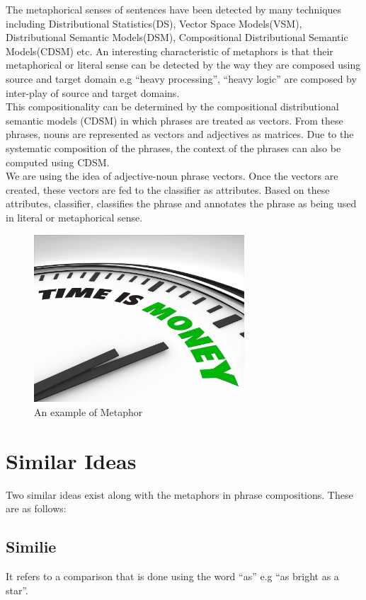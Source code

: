 \documentclass[a4paper]{article}
\begin{document}
The metaphorical senses of sentences have been detected by many techniques including Distributional Statistics(DS), Vector Space Models(VSM), Distributional Semantic Models(DSM), Compositional Distributional Semantic Models(CDSM) etc. An interesting characteristic of metaphors is that their metaphorical or literal sense can be detected by the way they are composed using source and target domain e.g “heavy processing”, “heavy logic” are composed by inter-play of source and target domains.\\

This compositionality can be determined by the compositional distributional semantic models (CDSM) in which phrases are treated as vectors. From these phrases, nouns are represented as vectors and adjectives as matrices. Due to the systematic composition of the phrases, the context of the phrases can also be computed using CDSM.\\

We are using the idea of adjective-noun phrase vectors. Once the vectors are created, these vectors are fed to the classifier as attributes. Based on these attributes, classifier, classifies the phrase and annotates the phrase as being used in literal or metaphorical sense.

\begin{figure}[h!]
  \centering
  \includegraphics[width=0.7\textwidth]{Time-is-Money}
  \caption{An example of Metaphor}
\end{figure}

\section{Similar Ideas}
Two similar ideas exist along with the metaphors in phrase compositions. These are as follows:

\subsection{Similie}
It refers to a comparison that is done using the word “as” e.g “as bright as a star”.
\end{document}

